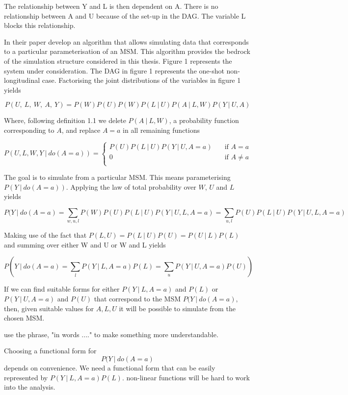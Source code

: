 \documentclass[11pt]{article}
\begin{document}
The relationship between Y and L is then dependent on A. There is no
relationship between A and U because of the set-up in the DAG. The
variable L blocks this relationship.

In their paper \citet{Havercroft2012} develop an algorithm that allows
simulating data that corresponds to a particular parameterisation of an
MSM. This algorithm provides the bedrock of the simulation structure
considered in this thesis. Figure 1 represents the system under
consideration. The DAG in figure 1 represents the one-shot
non-longitudinal case. Factorising the joint distributions of the
variables in figure 1 yields

\[P(U,\ L,\ W,\ A,\ Y) = P(W)P(U)P(W)P(L\ |\ U)P(A\ |\ L,W)P(Y\ |\ U,A)\]

Where, following definition 1.1 we delete \(P(A\ |\ L,W)\), a
probability function corresponding to \(A\), and replace \(A=a\) in all
remaining functions

\[ P(U, L, W, Y\ |\ do(A=a)) =
  \begin{cases}
    P(U)P(L\ |\ U)P(Y\ |\ U,A = a) & \quad \text{if } A = a\\
    0  & \quad \text{if } A \neq a\\
  \end{cases}
\]

The goal is to simulate from a particular MSM. This means parameterising
\(P(Y\ |\ do(A=a))\). Applying the law of total probability over \(W\),
\(U\) and \(L\) yields

\[P(Y\ |\ do(A=a) = \sum_{w, u, l} P(W)P(U)P(L\ |\ U)P(Y\ |\ U, L, A=a) = \sum_{u, l} P(U)P(L\ |\ U)P(Y\ |\ U, L, A=a)\]

Making use of the fact that
\(P(L, U) = P(L\ |\  U)P(U) = P(U\ |\ L)P(L)\) and summing over either W
and U or W and L yields

\[P(Y\ |\ do(A=a) = \sum_{l}P(Y\ |\ L, A=a)P(L) = \sum_{u} P(Y\ |\ U, A=a)P(U))\]

If we can find suitable forms for either \(P(Y\ |\ L, A=a)\) and
\(P(L)\) or \(P(Y\ |\ U, A=a)\) and \(P(U)\) that correspond to the MSM
\(P(Y\ |\ do(A=a)\), then, given suitable values for \(A, L, U\) it will
be possible to simulate from the chosen MSM.

use the phrase, "in words ...." to make something more understandable.

Choosing a functional form for \[P(Y\ |\ do(A=a)\] depends on
convenience. We need a functional form that can be easily represented by
\(P(Y\ |\ L, A=a)P(L)\). non-linear functions will be hard to work into
the analysis.
\end{document}
